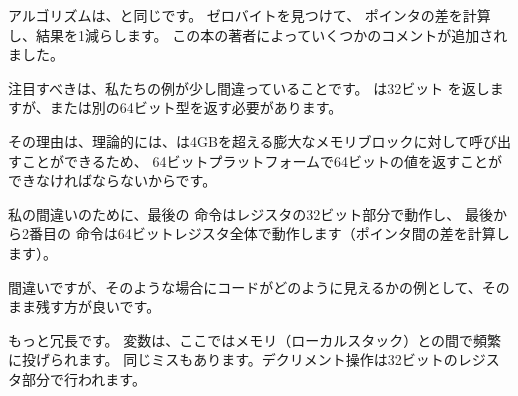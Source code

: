 ﻿




アルゴリズムは、と同じです。
ゼロバイトを見つけて、
ポインタの差を計算し、結果を1減らします。
この本の著者によっていくつかのコメントが追加されました。

注目すべきは、私たちの例が少し間違っていることです。
は32ビット \Tint を返しますが、または別の64ビット型を返す必要があります。

その理由は、理論的には、は4GBを超える膨大なメモリブロックに対して呼び出すことができるため、
64ビットプラットフォームで64ビットの値を返すことができなければならないからです。

私の間違いのために、最後の \SUB 命令はレジスタの32ビット部分で動作し、
最後から2番目の \SUB 命令は64ビットレジスタ全体で動作します（ポインタ間の差を計算します）。

間違いですが、そのような場合にコードがどのように見えるかの例として、そのまま残す方が良いです。




もっと冗長です。
変数は、ここではメモリ（ローカルスタック）との間で頻繁に投げられます。
同じミスもあります。デクリメント操作は32ビットのレジスタ部分で行われます。
